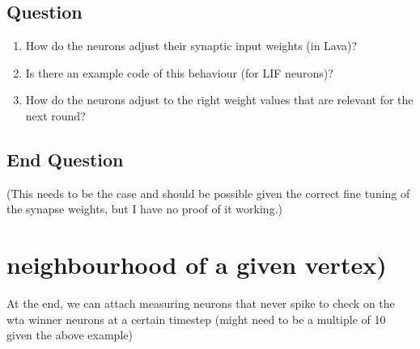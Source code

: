 \subsection{Question}
\begin{enumerate}
    \item How do the neurons adjust their synaptic input weights (in Lava)? 
    \item Is there an example code of this behaviour (for LIF neurons)?
    \item How do the neurons adjust to the right weight values that are relevant for the next round?
\end{enumerate}


\subsection{End Question}
(This needs to be the case and should be possible given the correct
fine tuning of the synapse weights, but I have no proof of it working.)


\section{neighbourhood of a given vertex)}\label{sec:neighbourhood}
At the end, we can attach measuring neurons that never spike to check on the
wta winner neurons at a certain timestep (might need to be a multiple of 10
given the above example)